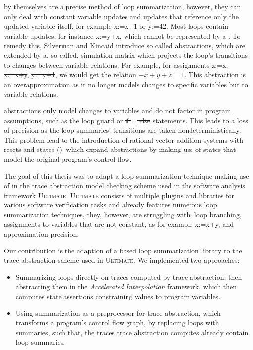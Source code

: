\qvasr by themselves are a precise method of loop summarization, however, they can only deal with constant variable updates and updates that reference only the updated variable itself, for example \st{x:=x+1} or \st{y:=42}. Most loops contain variable updates, for instance \st{x:=y+x}, which cannot be represented by a \qvasr. To remedy this, Silverman and Kincaid introduce so called \qvasr abstractions, which are \qvasr extended by a, so-called, simulation matrix which projects the loop's transitions to changes between variable relations. For example, for assignments \st{z:=x}, \st{x:=x+y}, \st{y:=y+1}, we would get the relation $-x + y + z = 1$.
This \qvasr abstraction is an overapproximation as it no longer models changes to specific variables but to variable relations.\par
\qvasr abstractions only model changes to variables and do not factor in program assumptions, such as the loop guard or \st{if $\ldots$ else} statements. This leads to a loss of precision as the loop summaries' transitions are taken nondeterministically. This problem lead to the introduction of rational vector addition systems with resets and states (\qvasrs), which expand \qvasr abstractions by making use of states that model the original program's control flow.\par
The goal of this thesis was to adapt a loop summarization technique making use of \qvasr in the trace abstraction\cite{10.1007/978-3-642-03237-0_7} model checking scheme used in the software analysis framework \textsc{Ultimate}\cite{Zitat02}.
\textsc{Ultimate} consists of multiple plugins and libraries for various software verification tasks and already features numerous loop summarization techniques, they, however, are struggling with, loop branching, assignments to variables that are not constant, as for example \st{x:=x+y}, and approximation precision.\par
Our contribution is the adaption of a \qvasr based loop summarization library to the trace abstraction scheme used in \textsc{Ultimate}. We implemented two approaches:
\begin{itemize}
	\item Summarizing loops directly on traces computed by trace abstraction, then abstracting them in the \textsl{Accelerated Interpolation} framework, which then computes state assertions constraining values to program variables.
	\item Using \qvasr summarization as a preprocessor for trace abstraction, which transforms a program's control flow graph, by replacing loops with \qvasr summaries, such that, the traces trace abstraction computes already contain loop summaries.
\end{itemize}

